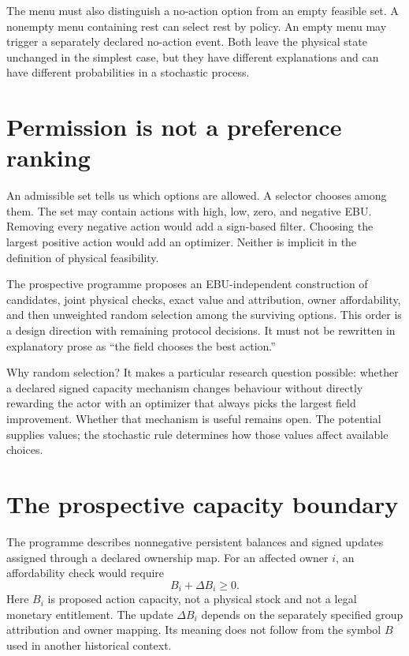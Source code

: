 The menu must also distinguish a no-action option from an empty feasible set. A nonempty menu containing rest can select rest by policy. An empty menu may trigger a separately declared no-action event. Both leave the physical state unchanged in the simplest case, but they have different explanations and can have different probabilities in a stochastic process.

\section{Permission is not a preference ranking}
An admissible set tells us which options are allowed. A selector chooses among them. The set may contain actions with high, low, zero, and negative EBU. Removing every negative action would add a sign-based filter. Choosing the largest positive action would add an optimizer. Neither is implicit in the definition of physical feasibility.

The prospective programme proposes an EBU-independent construction of candidates, joint physical checks, exact value and attribution, owner affordability, and then unweighted random selection among the surviving options. This order is a design direction with remaining protocol decisions. It must not be rewritten in explanatory prose as ``the field chooses the best action.''

Why random selection? It makes a particular research question possible: whether a declared signed capacity mechanism changes behaviour without directly rewarding the actor with an optimizer that always picks the largest field improvement. Whether that mechanism is useful remains open. The potential supplies values; the stochastic rule determines how those values affect available choices.

\section{The prospective capacity boundary}
The programme describes nonnegative persistent balances and signed updates assigned through a declared ownership map. For an affected owner \(i\), an affordability check would require
\begin{equation}
 B_i+\Delta B_i\geq0.
\end{equation}
Here \(B_i\) is proposed action capacity, not a physical stock and not a legal monetary entitlement. The update \(\Delta B_i\) depends on the separately specified group attribution and owner mapping. Its meaning does not follow from the symbol \(B\) used in another historical context.

